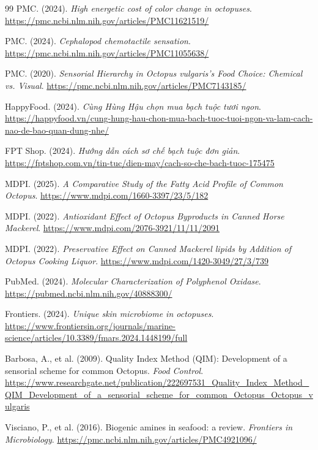 \documentclass[12pt,a4paper]{report}
\begin{document}
\begin{thebibliography}{99}
 PMC. (2024). \textit{High energetic cost of color change in octopuses}. \url{https://pmc.ncbi.nlm.nih.gov/articles/PMC11621519/}

 PMC. (2024). \textit{Cephalopod chemotactile sensation}. \url{https://pmc.ncbi.nlm.nih.gov/articles/PMC11055638/}

 PMC. (2020). \textit{Sensorial Hierarchy in Octopus vulgaris's Food Choice: Chemical vs. Visual}. \url{https://pmc.ncbi.nlm.nih.gov/articles/PMC7143185/}

 HappyFood. (2024). \textit{Cùng Hùng Hậu chọn mua bạch tuộc tươi ngon}. \url{https://happyfood.vn/cung-hung-hau-chon-mua-bach-tuoc-tuoi-ngon-va-lam-cach-nao-de-bao-quan-dung-nhe/}

 FPT Shop. (2024). \textit{Hướng dẫn cách sơ chế bạch tuộc đơn giản}. \url{https://fptshop.com.vn/tin-tuc/dien-may/cach-so-che-bach-tuoc-175475}

 MDPI. (2025). \textit{A Comparative Study of the Fatty Acid Profile of Common Octopus}. \url{https://www.mdpi.com/1660-3397/23/5/182}

 MDPI. (2022). \textit{Antioxidant Effect of Octopus Byproducts in Canned Horse Mackerel}. \url{https://www.mdpi.com/2076-3921/11/11/2091}

 MDPI. (2022). \textit{Preservative Effect on Canned Mackerel lipids by Addition of Octopus Cooking Liquor}. \url{https://www.mdpi.com/1420-3049/27/3/739}

 PubMed. (2024). \textit{Molecular Characterization of Polyphenol Oxidase}. \url{https://pubmed.ncbi.nlm.nih.gov/40888300/}

 Frontiers. (2024). \textit{Unique skin microbiome in octopuses}. \url{https://www.frontiersin.org/journals/marine-science/articles/10.3389/fmars.2024.1448199/full}

 Barbosa, A., et al. (2009). Quality Index Method (QIM): Development of a sensorial scheme for common Octopus. \textit{Food Control}. \url{https://www.researchgate.net/publication/222697531_Quality_Index_Method_QIM_Development_of_a_sensorial_scheme_for_common_Octopus_Octopus_vulgaris}

 Visciano, P., et al. (2016). Biogenic amines in seafood: a review. \textit{Frontiers in Microbiology}. \url{https://pmc.ncbi.nlm.nih.gov/articles/PMC4921096/}


\end{thebibliography}
\end{document}
